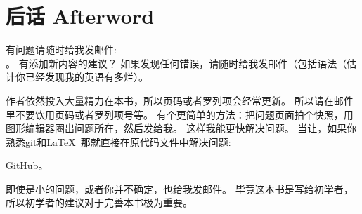 \documentclass[UTF8,nofonts]{ctexart}
\begin{document}

\part*{后话 Afterword}


有问题请随时给我发邮件: \\
\GTT{<\EMAIL>}。
有添加新内容的建议？
如果发现任何错误，请随时给我发邮件（包括语法（估计你已经发现我的英语有多烂）。

作者依然投入大量精力在本书，所以页码或者罗列项会经常更新。
所以请在邮件里不要饮用页码或者罗列项号等。
有个更简单的方法：把问题页面拍个快照，用图形编辑器圈出问题所在，然后发给我。
这样我能更快解决问题。
当让，如果你熟悉git和\LaTeX\, 那就直接在原代码文件中解决问题: 

\href{http://go.yurichev.com/17089}{GitHub}。

即使是小的问题，或者你并不确定，也给我发邮件。
毕竟这本书是写给初学者，所以初学者的建议对于完善本书极为重要。
\end{document}
